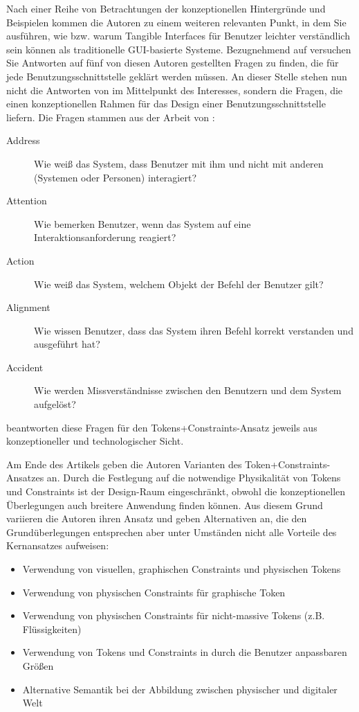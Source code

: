 Nach einer Reihe von Betrachtungen der konzeptionellen Hintergründe und Beispielen kommen die Autoren zu einem weiteren relevanten Punkt, in dem Sie ausführen, wie bzw. warum Tangible Interfaces für Benutzer leichter verständlich sein können als traditionelle \gls{GUI}-basierte Systeme. Bezugnehmend auf \citet{Bellotti02} versuchen Sie Antworten auf fünf von diesen Autoren gestellten Fragen zu finden, die für jede Benutzungsschnittstelle geklärt werden müssen. An dieser Stelle stehen nun nicht die Antworten von \citeauthor{Ullmer05} im Mittelpunkt des Interesses, sondern die Fragen, die einen konzeptionellen Rahmen für das Design einer Benutzungsschnittstelle liefern. Die Fragen stammen aus der Arbeit von \citet{Bellotti02}:
\begin{description}
	\item[Address] Wie weiß das System, dass Benutzer mit ihm und nicht mit anderen (Systemen oder Personen) interagiert?
	\item[Attention] Wie bemerken Benutzer, wenn das System auf eine Interaktionsanforderung reagiert? 
	\item[Action] Wie weiß das System, welchem Objekt der Befehl der Benutzer gilt?
	\item[Alignment] Wie wissen Benutzer, dass das System ihren Befehl korrekt verstanden und ausgeführt hat?
	\item[Accident] Wie werden Missverständnisse zwischen den Benutzern und dem System aufgelöst?
\end{description}
\citeauthor{Ullmer05} beantworten diese Fragen für den Tokens+Constraints-Ansatz jeweils aus konzeptioneller und technologischer Sicht. 

Am Ende des Artikels geben die Autoren Varianten des Token+Constraints-Ansatzes an. Durch die Festlegung auf die notwendige Physikalität von Tokens und Constraints ist der Design-Raum eingeschränkt, obwohl die konzeptionellen Überlegungen auch breitere Anwendung finden können. Aus diesem Grund variieren die Autoren ihren Ansatz und geben Alternativen an, die den Grundüberlegungen entsprechen aber unter Umständen nicht alle Vorteile des Kernansatzes aufweisen:
\begin{itemize}
	\item Verwendung von visuellen, graphischen Constraints und physischen Tokens
	\item Verwendung von physischen Constraints für graphische Token
	\item Verwendung von physischen Constraints für nicht-massive Tokens (z.B. Flüssigkeiten)
	\item Verwendung von Tokens und Constraints in durch die Benutzer anpassbaren Größen
	\item Alternative Semantik bei der Abbildung zwischen physischer und digitaler Welt
\end{itemize}

